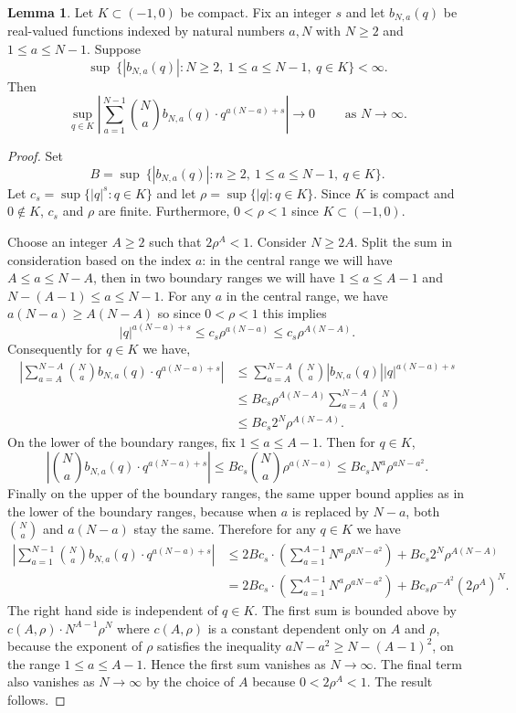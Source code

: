 \documentclass[12pt]{amsart}
\theoremstyle{definition}
\newtheorem{lemma}[theorem]{Lemma}
\begin{document}
\begin{lemma}\label{lem:kernel}
Let $K \subset (-1,0)$ be compact. Fix an integer $s$ and let $b_{N,a}(q)$ be real-valued functions indexed by natural numbers $a,N$ with $N \geq 2$ and $1 \leq a \leq N-1$. Suppose
\[
\sup \ \{ |b_{N,a}(q)| \colon N \geq 2, \ 1 \leq a \leq N-1, \ q \in K \} <\infty.
\]
Then
\[
\sup_{q \in K} \left| \sum_{a=1}^{N-1} \binom{N}{a}b_{N,a}(q) \cdot q^{a(N-a)+s} \right| \to 0 \qquad \text{ as } N \to \infty.
\]
\end{lemma}
\begin{proof}
Set 
\[
B = \sup \ \{ |b_{N,a}(q)| \colon n \geq 2, \ 1 \leq a \leq N-1, \ q \in K \}.
\]
Let $c_s=\sup\{|q|^s \colon q \in K\}$ and let $\rho=\sup\{|q| \colon q \in K\}$. Since $K$ is compact and $0 \notin K$, $c_s$ and $\rho$ are finite. Furthermore, $0<\rho<1$ since $K \subset (-1,0)$.

Choose an integer $A \geq 2$ such that $2\rho^A<1$. Consider $N \geq 2A$. Split the sum in consideration based on the index $a$: in the central range we will have $A \leq a \leq N-A$, then in two boundary ranges we will have $1 \leq a \leq A-1$ and $N-(A-1) \leq a \leq N-1$. For any $a$ in the central range, we have $a(N-a) \geq A(N-A)$ so since $0<\rho<1$ this implies
\[
|q|^{a(N-a)+s} \leq c_s \rho^{a(N-a)} \leq c_s \rho^{A(N-A)}.
\]
Consequently for $q \in K$ we have,
\begin{align*}
\left| \sum_{a=A}^{N-A} \binom{N}{a} b_{N,a}(q) \cdot q^{a(N-a)+s} \right| &\leq \sum_{a=A}^{N-A} \binom{N}{a} |b_{N,a}(q)||q|^{a(N-a)+s} \\ &\leq Bc_s \rho^{A(N-A)} \sum_{a=A}^{N-A} \binom{N}{a} \\
&\leq Bc_s2^N\rho^{A(N-A)}.
\end{align*}
On the lower of the boundary ranges, fix $1 \leq a \leq A-1$. Then for $q \in K$,
\[
\left|\binom{N}{a}b_{N,a}(q) \cdot q^{a(N-a)+s}\right| \leq Bc_s\binom{N}{a}\rho^{a(N-a)} \leq Bc_sN^a\rho^{aN-a^2}.
\]
Finally on the upper of the boundary ranges, the same upper bound applies as in the lower of the boundary ranges, because when $a$ is replaced by $N-a$, both $\binom{N}{a}$ and $a(N-a)$ stay the same. Therefore for any $q \in K$ we have 
\begin{align*}
\left| \sum_{a=1}^{N-1} \binom{N}{a}b_{N,a}(q) \cdot q^{a(N-a)+s} \right|  &\leq 2Bc_s \cdot \left(\sum_{a=1}^{A-1} N^a\rho^{aN-a^2}\right) + Bc_s2^N\rho^{A(N-A)} \\
&= 2Bc_s \cdot \left(\sum_{a=1}^{A-1} N^a\rho^{aN-a^2}\right) + Bc_s\rho^{-A^2}(2\rho^A)^N.
\end{align*}
The right hand side is independent of $q \in K$. The first sum is bounded above by $c(A,\rho) \cdot N^{A-1}\rho^N$ where $c(A,\rho)$ is a constant dependent only on $A$ and $\rho$, because the exponent of $\rho$ satisfies the inequality $aN-a^2 \geq N-(A-1)^2$, on the range $1 \leq a \leq A-1$. Hence the first sum vanishes as $N \to \infty$. The final term also vanishes as $N \to \infty$ by the choice of $A$ because $0<2\rho^A<1$. The result follows.
\end{proof}
\end{document}
